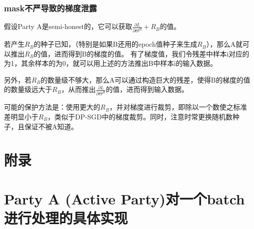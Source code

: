 \documentclass[twoside,11pt]{article}
\begin{document}
\subsubsection{mask不严导致的梯度泄露}
假设Party A是semi-honest的，它可以获取$\frac{\partial L}{\partial \Theta^B}+R_B$的值。

若产生$R_B$的种子已知，（特别是如果B还用的epoch值种子来生成$R_B$），那么A就可以推出$R_B$的值，进而得到B的梯度的值。
有了梯度值，我们令残差中样本i对应的为1，其余样本的为0，就可以用上述的方法推出B中样本i的输入数据。

另外，若$R_B$的数量级不够大，那么A可以通过构造巨大的残差，使得B的梯度的值的数量级远大于$R_B$，从而推出$\frac{\partial L}{\partial \Theta^B}$的值，进而得到输入数据。

可能的保护方法是：使用更大的$R_B$，并对梯度进行裁剪，即除以一个数使之标准差明显小于$R_B$，类似于DP-SGD中的梯度裁剪。同时，注意时常更换随机数种子，且保证不被A知道。

\appendix
\section*{附录}

\section{Party A (Active Party)对一个batch进行处理的具体实现}
\end{document}
